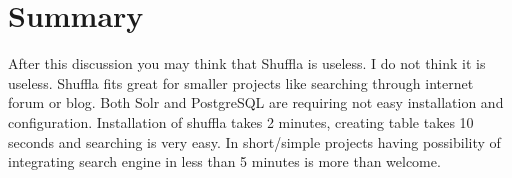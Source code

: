 \documentclass[10pt,a4paper]{article}
\begin{document}
\section{Summary}

After this discussion you may think that Shuffla is useless. I do not think it is useless. Shuffla fits great for smaller projects like searching through internet forum or blog. Both Solr and PostgreSQL are requiring not easy installation and configuration. Installation of shuffla takes 2 minutes, creating table takes 10 seconds and searching is very easy. In short/simple projects having possibility of integrating search engine in less than 5 minutes is more than welcome.




\end{document}
